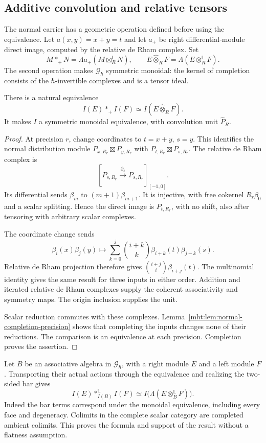 \subsection{Additive convolution and relative tensors}

The normal carrier has a geometric operation defined before
using the equivalence. Let $a(x,y)=x+y=t$ and let $a_+$ be
right differential-module direct image, computed by the
relative de Rham complex. Set
\[
 M*_+N=\Lambda a_+(M\boxtimes_R^{\mathbb L}N),
 \qquad E\widehat\otimes_R F=\Lambda(E\otimes_R^{\mathbb L}F).
\]
The second operation makes $\mathcal G_\hbar$ symmetric
monoidal: the kernel of completion consists of the
$\hbar$-invertible complexes and is a tensor ideal.

\begin{proposition}\label{mht:prop:adic-normal-convolution}
There is a natural equivalence
\[
 I(E)*_+I(F)\simeq I(E\widehat\otimes_R F).
\]
It makes $I$ a symmetric monoidal equivalence, with
convolution unit $\widehat P_R$.
\end{proposition}
\begin{proof}
At precision $r$, change coordinates to $t=x+y$, $s=y$.
This identifies the normal distribution module
$P_{x,R_r}\boxtimes P_{y,R_r}$ with
$P_{t,R_r}\boxtimes P_{s,R_r}$.
The relative de Rham complex is
\[
 [P_{s,R_r}\xrightarrow{\partial_s}P_{s,R_r}]_{[-1,0]}.
\]
Its differential sends $\beta_m$ to $(m+1)\beta_{m+1}$.
It is injective, with free cokernel $R_r\beta_0$ and a
scalar splitting. Hence the direct image is $P_{t,R_r}$,
with no shift, also after tensoring with arbitrary scalar
complexes.

The coordinate change sends
\[
 \beta_i(x)\beta_j(y)\longmapsto
       \sum_{k=0}^j\binom{i+k}{k}
                       \beta_{i+k}(t)\beta_{j-k}(s).
\]
Relative de Rham projection therefore gives
$\binom{i+j}{i}\beta_{i+j}(t)$.
The multinomial identity gives the same result for three
inputs in either order. Addition and iterated relative
de Rham complexes supply the coherent associativity and
symmetry maps. The origin inclusion supplies the unit.

Scalar reduction commutes with these complexes.
Lemma~\ref{mht:lem:normal-completion-precision} shows that
completing the inputs changes none of their reductions.
The comparison is an equivalence at each precision.
Completion proves the assertion.
\end{proof}

Let $B$ be an associative algebra in $\mathcal G_\hbar$,
with a right module $E$ and a left module $F$.
Transporting their actual actions through the equivalence
and realizing the two-sided bar gives
\begin{equation}\label{mht:eq:normal-relative-convolution}
 I(E)*_{I(B)}^{\mathbb L}I(F)
       \simeq I\bigl(\Lambda(E\otimes_B^{\mathbb L}F)\bigr).
\end{equation}
Indeed the bar terms correspond under the monoidal
equivalence, including every face and degeneracy.
Colimits in the complete scalar category are completed
ambient colimits. This proves the formula and support
of the result without a flatness assumption.

